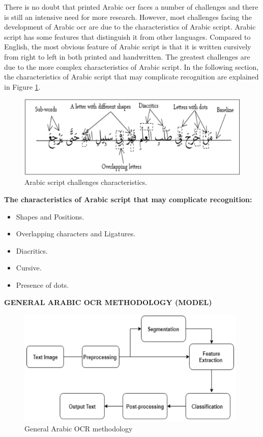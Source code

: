 There is no doubt that printed Arabic \acrshort{ocr} faces a number of challenges and there is still an intensive need for more research. However, most challenges facing the development of Arabic \acrshort{ocr} are due to the characteristics of Arabic script. Arabic script has some features that distinguish it from other languages. Compared to English, the most obvious feature of Arabic script is that it is written cursively from right to left in both printed and handwritten. The greatest challenges are due to the more complex characteristics of Arabic script. In the following section, the characteristics of Arabic script that may complicate recognition are explained in Figure \ref{fig:ocr2}.

\begin{figure}[!htb]
    \centering
    \includegraphics[width=13cm]{images/ocr2.png}
    \caption{Arabic script challenges characteristics.}
    \label{fig:ocr2}
\end{figure}


\textbf{The characteristics of Arabic script that may complicate recognition:}
    \begin{itemize}[itemsep=1pt, topsep=5pt]
        \item   Shapes and Positions.
        \item   Overlapping characters and Ligatures.
        \item   Diacritics.
        \item   Cursive.
        \item   Presence of dots.
    \end{itemize}  

\textbf{GENERAL ARABIC OCR METHODOLOGY (MODEL)}
\begin{figure}[H]
    \centering
    \includegraphics[width=11cm]{images/ocr3.png}
    \caption{General Arabic OCR methodology}
    \label{fig:ocr3}
\end{figure}

